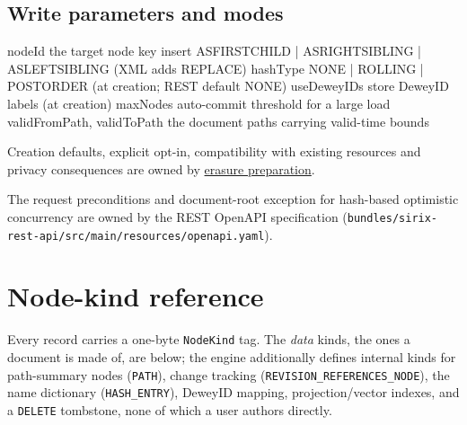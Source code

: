 \documentclass[11pt,a4paper,oneside]{report}
\newcommand{\dcap}[1]{\par\vspace{1pt}\noindent{\small\sffamily\bfseries\color{slate}#1}\par\vspace{-2pt}}
\theoremstyle{sirixthm}
\newcommand{\code}[1]{\texttt{#1}}
\begin{document}
\subsection{Write parameters and modes}

\dcap{Write parameters}
\begin{diagramS}
nodeId                       the target node key
insert                       ASFIRSTCHILD | ASRIGHTSIBLING | ASLEFTSIBLING   (XML adds REPLACE)
hashType                     NONE | ROLLING | POSTORDER   (at creation; REST default NONE)
useDeweyIDs                  store DeweyID labels                            (at creation)
maxNodes                     auto-commit threshold for a large load
validFromPath, validToPath   the document paths carrying valid-time bounds
\end{diagramS}

\noindent Creation defaults, explicit opt-in, compatibility with existing resources and privacy
consequences are owned by \href{ERASURE_PREPARATION.md}{erasure preparation}.

The request preconditions and document-root exception for hash-based optimistic concurrency are
owned by the REST OpenAPI specification (\code{bundles/sirix-rest-api/src/main/resources/openapi.yaml}).

\section{Node-kind reference}
\label{app:nodekinds}

Every record carries a one-byte \code{NodeKind} tag. The \emph{data} kinds, the ones a document is made
of, are below; the engine additionally defines internal kinds for path-summary nodes (\code{PATH}),
change tracking (\code{REVISION\_REFERENCES\_NODE}), the
name dictionary (\code{HASH\_ENTRY}), DeweyID mapping, projection/vector indexes, and a
\code{DELETE} tombstone, none of which a user authors directly.
\end{document}
